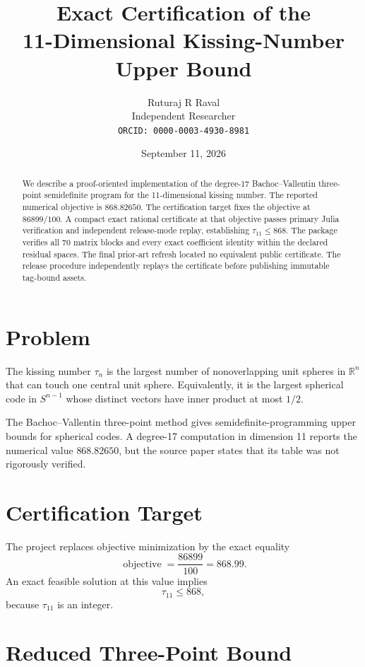 \documentclass[11pt]{article}
\title{Exact Certification of the\\
11-Dimensional Kissing-Number Upper Bound}
\author{Ruturaj R Raval\\Independent Researcher\\
\texttt{ORCID: 0000-0003-4930-8981}}
\date{September 11, 2026}
\begin{document}
\maketitle

\begin{abstract}
We describe a proof-oriented implementation of the degree-17
Bachoc--Vallentin three-point semidefinite program for the
11-dimensional kissing number. The reported numerical objective is
$868.82650$. The certification target fixes the objective at
$86899/100$. A compact exact rational certificate at that objective passes
primary Julia verification and independent release-mode replay, establishing
$\tau_{11}\leq 868$. The package verifies all 70 matrix blocks
and every exact coefficient identity within the declared residual spaces.
The final prior-art refresh located no equivalent public certificate. The
release procedure independently replays the certificate before publishing
immutable tag-bound assets.
\end{abstract}

\section{Problem}

The kissing number $\tau_n$ is the largest number of nonoverlapping unit
spheres in $\mathbb{R}^n$ that can touch one central unit sphere. Equivalently,
it is the largest spherical code in $S^{n-1}$ whose distinct vectors have
inner product at most $1/2$.

The Bachoc--Vallentin three-point method gives semidefinite-programming upper
bounds for spherical codes. A degree-17 computation in dimension 11 reports
the numerical value $868.82650$, but the source paper states that its table
was not rigorously verified.

\section{Certification Target}

The project replaces objective minimization by the exact equality
\[
  \operatorname{objective}=\frac{86899}{100}=868.99.
\]
An exact feasible solution at this value implies
\[
  \tau_{11}\leq 868,
\]
because $\tau_{11}$ is an integer.

\section{Reduced Three-Point Bound}
\end{document}
